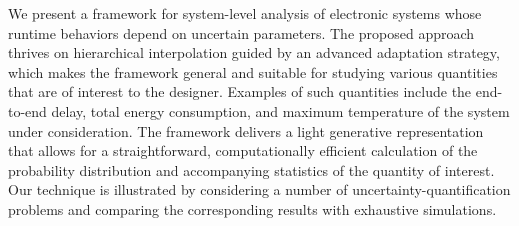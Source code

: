 We present a framework for system-level analysis of electronic systems whose
runtime behaviors depend on uncertain parameters. The proposed approach thrives
on hierarchical interpolation guided by an advanced adaptation strategy, which
makes the framework general and suitable for studying various quantities that
are of interest to the designer. Examples of such quantities include the
end-to-end delay, total energy consumption, and maximum temperature of the
system under consideration. The framework delivers a light generative
representation that allows for a straightforward, computationally efficient
calculation of the probability distribution and accompanying statistics of the
quantity of interest. Our technique is illustrated by considering a number of
uncertainty-quantification problems and comparing the corresponding results with
exhaustive simulations.
